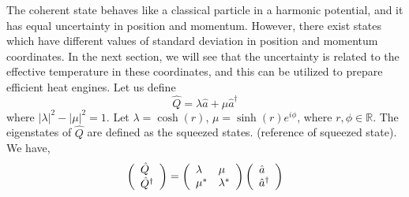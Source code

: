 \documentclass[12pt, twoside]{article}
\begin{document}
The coherent state behaves like a classical particle in a harmonic potential, and it has equal uncertainty in position and momentum. However, there exist states which have different values of standard deviation in position and momentum coordinates. In the next section, we will see that the uncertainty is related to the effective temperature in these coordinates, and this can be utilized to prepare efficient heat engines. Let us define \begin{equation} \label{eq:squeeze}
\hat{Q} = \lambda \hat{a} + \mu \hat{a}^\dagger
\end{equation} where $|\lambda|^2 - |\mu|^2 = 1$. Let $\lambda = \cosh(r)$, $\mu = \sinh(r)e^{i\phi}$, where $r,\phi \in \mathbb{R}$. The eigenstates of $\hat{Q}$ are defined as the squeezed states. (reference of squeezed state).
 We have,
 \[  \left( \begin{array} { l } { \hat { Q } } \\ { \hat { Q } ^ { \dagger } } \end{array} \right) = \left( \begin{array} { l l } { \lambda } & { \mu } \\ { \mu ^ { * } } & { \lambda ^ { * } } \end{array} \right) \left( \begin{array} { l } { \hat{a} } \\ { \hat{a}^\dagger } \end{array} \right)\]
 
\end{document}
